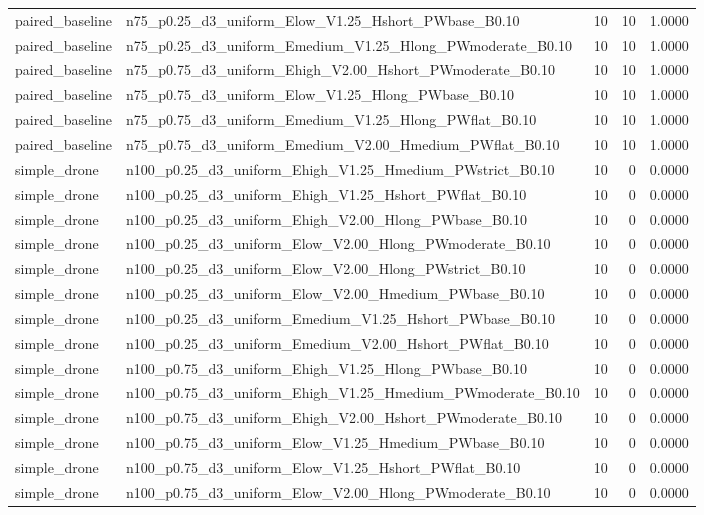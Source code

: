 \begin{tabular}{llrrr}
paired_baseline & n75_p0.25_d3_uniform_Elow_V1.25_Hshort_PWbase_B0.10 & 10 & 10 & 1.0000 \\
paired_baseline & n75_p0.25_d3_uniform_Emedium_V1.25_Hlong_PWmoderate_B0.10 & 10 & 10 & 1.0000 \\
paired_baseline & n75_p0.75_d3_uniform_Ehigh_V2.00_Hshort_PWmoderate_B0.10 & 10 & 10 & 1.0000 \\
paired_baseline & n75_p0.75_d3_uniform_Elow_V1.25_Hlong_PWbase_B0.10 & 10 & 10 & 1.0000 \\
paired_baseline & n75_p0.75_d3_uniform_Emedium_V1.25_Hlong_PWflat_B0.10 & 10 & 10 & 1.0000 \\
paired_baseline & n75_p0.75_d3_uniform_Emedium_V2.00_Hmedium_PWflat_B0.10 & 10 & 10 & 1.0000 \\
simple_drone & n100_p0.25_d3_uniform_Ehigh_V1.25_Hmedium_PWstrict_B0.10 & 10 & 0 & 0.0000 \\
simple_drone & n100_p0.25_d3_uniform_Ehigh_V1.25_Hshort_PWflat_B0.10 & 10 & 0 & 0.0000 \\
simple_drone & n100_p0.25_d3_uniform_Ehigh_V2.00_Hlong_PWbase_B0.10 & 10 & 0 & 0.0000 \\
simple_drone & n100_p0.25_d3_uniform_Elow_V2.00_Hlong_PWmoderate_B0.10 & 10 & 0 & 0.0000 \\
simple_drone & n100_p0.25_d3_uniform_Elow_V2.00_Hlong_PWstrict_B0.10 & 10 & 0 & 0.0000 \\
simple_drone & n100_p0.25_d3_uniform_Elow_V2.00_Hmedium_PWbase_B0.10 & 10 & 0 & 0.0000 \\
simple_drone & n100_p0.25_d3_uniform_Emedium_V1.25_Hshort_PWbase_B0.10 & 10 & 0 & 0.0000 \\
simple_drone & n100_p0.25_d3_uniform_Emedium_V2.00_Hshort_PWflat_B0.10 & 10 & 0 & 0.0000 \\
simple_drone & n100_p0.75_d3_uniform_Ehigh_V1.25_Hlong_PWbase_B0.10 & 10 & 0 & 0.0000 \\
simple_drone & n100_p0.75_d3_uniform_Ehigh_V1.25_Hmedium_PWmoderate_B0.10 & 10 & 0 & 0.0000 \\
simple_drone & n100_p0.75_d3_uniform_Ehigh_V2.00_Hshort_PWmoderate_B0.10 & 10 & 0 & 0.0000 \\
simple_drone & n100_p0.75_d3_uniform_Elow_V1.25_Hmedium_PWbase_B0.10 & 10 & 0 & 0.0000 \\
simple_drone & n100_p0.75_d3_uniform_Elow_V1.25_Hshort_PWflat_B0.10 & 10 & 0 & 0.0000 \\
simple_drone & n100_p0.75_d3_uniform_Elow_V2.00_Hlong_PWmoderate_B0.10 & 10 & 0 & 0.0000 \\

\end{tabular}
